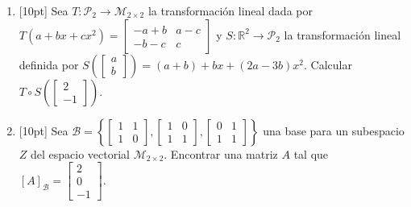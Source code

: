 \documentclass[11pt]{article}
\newcommand{\vf}{\fbox{V}\ \fbox{F}}
\begin{document}
\begin{enumerate}
\vspace{6pt}
\noindent (d) [3pt] El vector $\begin{bmatrix}1\\2\\-1\end{bmatrix}$ pertenece a $\mathrm{Nul}\left(\begin{bmatrix}1&-1&1\\1&2&2\\0&1&1\end{bmatrix}\right)$. \hfill\vf

\vspace{6pt}
\noindent (e) [3pt] Si $p_1(x), p_2(x), p_3(x), p_4(x)$ son polinomios en el espacio vectorial $\mathcal{P}_3$, entonces el conjunto $\{p_1(x),p_2(x),p_3(x),p_4(x)\}$ es necesariamente L.D. \hfill\vf

\item{}[10pt] Sea $T:\mathcal{P}_2\to\mathcal{M}_{2\times 2}$ la transformación lineal dada por $T(a+bx+cx^2)=\begin{bmatrix}-a+b&a-c\\-b-c&c\end{bmatrix}$ y $S:\mathbb{R}^2\to\mathcal{P}_2$ la transformación lineal definida por $S\left(\begin{bmatrix}a\\b\end{bmatrix}\right)=(a+b)+bx+(2a-3b)x^2$. Calcular $T\circ S\left(\begin{bmatrix}2\\-1\end{bmatrix}\right)$.

\vspace{4pt}

\item{}[10pt] Sea $\mathcal{B}=\left\{\begin{bmatrix}1&1\\1&0\end{bmatrix},\begin{bmatrix}1&0\\1&1\end{bmatrix},\begin{bmatrix}0&1\\1&1\end{bmatrix}\right\}$ una base para un subespacio $Z$ del espacio vectorial $\mathcal{M}_{2\times 2}$. Encontrar una matriz $A$ tal que $[A]_{\mathcal{B}}=\begin{bmatrix}2\\0\\-1\end{bmatrix}$.


\end{enumerate}
\end{document}
